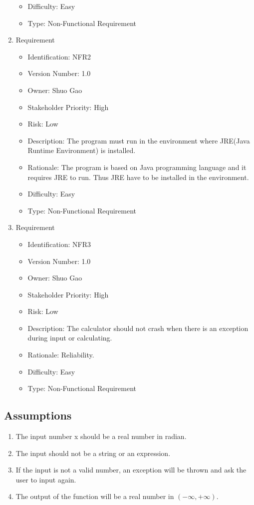 \documentclass{article}
\begin{document}
\begin{enumerate}
\begin{itemize}
        \item Difficulty: Easy
        \item Type: Non-Functional Requirement
    \end{itemize}
    \item Requirement 
    \begin{itemize}
        \item Identification: NFR2
        \item Version Number: 1.0
        \item Owner: Shuo Gao
        \item Stakeholder Priority: High
        \item Risk: Low
        \item Description: The program must run in the environment where JRE(Java Runtime Environment) is installed.
        \item Rationale: The program is based on Java programming language and it requires JRE to run. Thus JRE have to be installed in the environment.
        \item Difficulty: Easy
        \item Type: Non-Functional Requirement
    \end{itemize}
    \item Requirement 
    \begin{itemize}
        \item Identification: NFR3
        \item Version Number: 1.0
        \item Owner: Shuo Gao
        \item Stakeholder Priority: High
        \item Risk: Low
        \item Description: The calculator should not crash when there is an exception during input or calculating.
        \item Rationale: Reliability.
        \item Difficulty: Easy
        \item Type: Non-Functional Requirement
    \end{itemize}
\end{enumerate}

\subsection{Assumptions}
\begin{enumerate}
    \item The input number x should be a real number in radian.
    \item The input should not be a string or an expression.
    \item If the input is not a valid number, an exception will be thrown and ask the user to input again.
    \item The output of the function will be a real number in $(-\infty, +\infty)$.
\end{enumerate}
\end{document}
